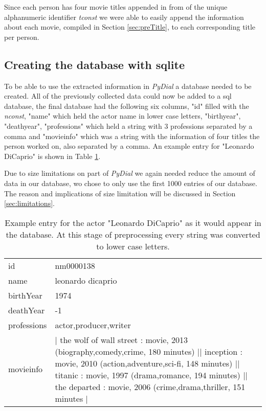 \documentclass[11pt,a4paper]{article}
\begin{document}
	Since each person has four movie titles appended in from of the unique alphanumeric identifier \emph{tconst} we were able to easily append the information about each movie, compiled in Section \ref{sec:preTitle}, to each corresponding title per person.
	
	\subsection{Creating the database with sqlite}
	\label{sec:CreateDatabase}
	To be able to use the extracted information in \emph{PyDial} a database needed to be created. All of the previously collected data could now be added to a sql database, the final database had the following six columns, "id" filled with the \emph{nconst}, "name" which held the actor name in lower case letters, "birthyear", "deathyear", "professions" which held a string with 3 professions separated by a comma and "movieinfo" which was a string with the information of four titles the person worked on, also separated by a comma. An example entry for "Leonardo DiCaprio" is shown in Table \ref{tab:database}.
	
	Due to size limitations on part of \emph{PyDial} we again needed reduce the amount of data in our database, wo chose to only use the first 1000 entries of our database. The reason and implications of size limitation will be discussed in Section \ref{sec:limitations}.
	
	\begin{table}[h]
		\begin{tabular}{lp{}}
			\toprule[0.5mm]
			id & nm0000138 \\[0.7mm]
			name & leonardo dicaprio \\[0.7mm]
			birthYear & 1974 \\[0.7mm]
			deathYear & -1 \\[0.7mm]
			professions & actor,producer,writer \\[0.7mm]
			movieinfo & | the wolf of wall street : movie, 2013 (biography,comedy,crime, 180 minutes) || inception : movie, 2010 (action,adventure,sci-fi, 148 minutes) || titanic : movie, 1997 (drama,romance, 194 minutes) || the departed : movie, 2006 (crime,drama,thriller, 151 minutes |\\[0.7mm]
			\bottomrule[0.5mm]
		\end{tabular}
		\caption{Example entry for the actor "Leonardo DiCaprio" as it would appear in the database. At this stage of preprocessing every string was converted to lower case letters.}
		\label{tab:database}
	\end{table}
	
\end{document}
